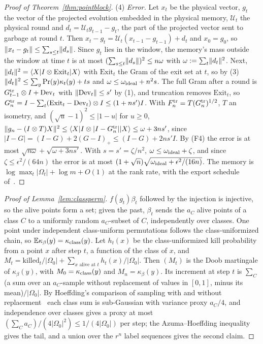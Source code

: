 \begin{proof}[Proof of Theorem~\ref{thm:pointblock}]
(4) \emph{Error.} Let $x_t$ be the physical vector, $g_t$ the vector of the projected evolution embedded in the physical memory, $\mathcal U_t$ the physical round and
$d_t=\mathcal U_tg_{t-1}-g_t$, the part of the projected vector sent to garbage at round $t$. Then $x_t-g_t=\mathcal U_t(x_{t-1}-g_{t-1})+d_t$ and $x_0=g_0$, so
$\lVert x_t-g_t\rVert\le\sum_{s\le t}\lVert d_s\rVert$. Since $g_t$ lies in the window, the memory's mass outside the window at time $t$ is at most $(\sum_{s\le t}\lVert d_s\rVert)^2\le n\omega$ with
$\omega:=\sum_t\lVert d_t\rVert^2$. Next, $\lVert d_t\rVert^2=\langle X|I\otimes\mathrm{Exit}_t|X\rangle$ with $\mathrm{Exit}_t$ the Gram of the exit set at $t$, so by (3)
$\lVert d_t\rVert^2\le\sum_y\Pr(y)\kappa_t(y)+ts$ and $\omega\le\omega_{\rm ideal}+n^2s$. The full Gram after a round is $G^{\rm tr}_{t-1}\otimes I+\mathrm{Dev}_t$ with $\lVert \mathrm{Dev}_t\rVert\le s'$
by (1), and truncation removes $\mathrm{Exit}_t$, so $G^{\rm tr}_n=I-\sum_t(\mathrm{Exit}_t-\mathrm{Dev}_t)\otimes I\le(1+ns')I$. With $F^{\rm tr}_n=T(G^{\rm tr}_n)^{1/2}$, $T$ an isometry, and
$(\sqrt u-1)^2\le|1-u|$ for $u\ge0$, $\lVert g_n-(I\otimes T)X\rVert^2\le\langle X|I\otimes|I-G^{\rm tr}_n||X\rangle\le\omega+3ns'$, since $|I-G|=(I-G)+2(G-I)_+\le(I-G)+2ns'I$. By (F4)
the error is at most $\sqrt{n\omega}+\sqrt{\omega+3ns'}$. With $s=s'=\zeta/n^2$, $\omega\le\omega_{\rm ideal}+\zeta$, and since $\zeta\le\epsilon^2/(64n)$ the error is at most
$(1+\sqrt n)\sqrt{\omega_{\rm ideal}+\epsilon^2/(16n)}$. The memory is $\log\max_t|\Omega_t|+\log m+O(1)$ at the rank rate, with the export schedule
of~\cite[Theorem~12.2]{DouglasMghirbiC}.
\end{proof}

\begin{proof}[Proof of Lemma~\ref{lem:classperm}]
$f(g_t)\beta_t$ followed by the injection is injective, so the alive points form a set; given the past, $\beta_t$ sends the $a_C$ alive points of a class $C$ to a uniformly
random $a_C$-subset of $C$, independently over classes. One point under independent class-uniform permutations follows the class-uniformized chain, so
$\mathbb E\kappa_\beta(y)=\kappa_{\rm class}(y)$. Let $h_t(x)$ be the class-uniformized kill probability from a point $x$ after step $t$, a function of the class of $x$, and
$M_t=\mathrm{killed}_t/|\Omega_0|+\sum_{x\text{ alive at }t}h_t(x)/|\Omega_0|$. Then $(M_t)$ is the Doob martingale of $\kappa_\beta(y)$, with $M_0=\kappa_{\rm class}(y)$ and
$M_n=\kappa_\beta(y)$. Its increment at step $t$ is $\sum_C$ (a sum over an $a_C$-sample without replacement of values in $[0,1]$, minus its mean)$/|\Omega_0|$. By Hoeffding's
comparison of sampling with and without replacement~\cite[Theorem~4]{Hoeffding1963} each class sum is sub-Gaussian with variance proxy $a_C/4$, and independence over
classes gives a proxy at most $(\sum_Ca_C)/(4|\Omega_0|^2)\le1/(4|\Omega_0|)$ per step; the Azuma--Hoeffding inequality~\cite{Azuma1967} gives the tail, and a union over
the $r^n$ label sequences gives the second claim.
\end{proof}

